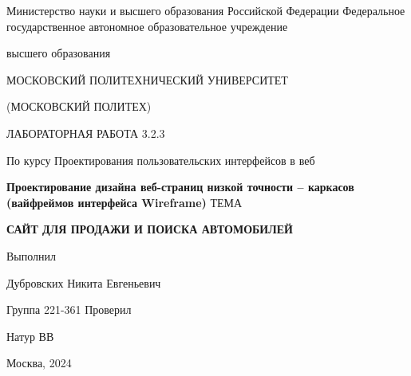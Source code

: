 \singlespacing

\newpage
\begin{center}
    Министерство науки и высшего образования Российской Федерации
    Федеральное государственное автономное образовательное учреждение

    высшего образования

    \guillemotleft МОСКОВСКИЙ ПОЛИТЕХНИЧЕСКИЙ УНИВЕРСИТЕТ\guillemotright

    (МОСКОВСКИЙ ПОЛИТЕХ)
\end{center}
\noindent
\bigbreak
\bigbreak
\bigbreak
\bigbreak
\begin{center}
    ЛАБОРАТОРНАЯ РАБОТА 3.2.3

    По курсу Проектирования пользовательских интерфейсов в веб

    \textbf{Проектирование дизайна веб-страниц низкой точности – каркасов (вайфреймов интерфейса Wireframe)}
    \bigbreak
    \bigbreak
    \bigbreak
    \bigbreak
    ТЕМА

    \guillemotleft\textbf{САЙТ ДЛЯ ПРОДАЖИ И ПОИСКА АВТОМОБИЛЕЙ}\guillemotright
\end{center}
\noindent
\bigbreak
\bigbreak
\bigbreak
\bigbreak
\bigbreak
\bigbreak
\bigbreak
\bigbreak
\bigbreak
\bigbreak
\hfill Выполнил

\hfill Дубровских Никита Евгеньевич

\hfill Группа 221-361
\bigbreak
\bigbreak
\bigbreak
\hfill Проверил

\hfill Натур ВВ
\vfill
\begin{center}
    Москва, 2024
\end{center}
\newpage
\onehalfspacing
